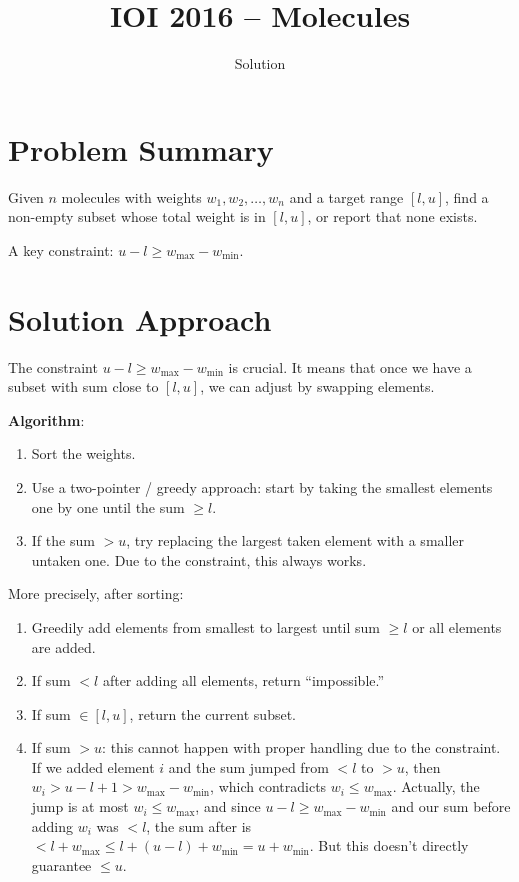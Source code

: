 \documentclass[11pt,a4paper]{article}
\title{IOI 2016 -- Molecules}
\author{Solution}
\date{}
\begin{document}
\maketitle

\section{Problem Summary}

Given $n$ molecules with weights $w_1, w_2, \ldots, w_n$ and a target range $[l, u]$, find a non-empty subset whose total weight is in $[l, u]$, or report that none exists.

A key constraint: $u - l \ge w_{\max} - w_{\min}$.

\section{Solution Approach}

The constraint $u - l \ge w_{\max} - w_{\min}$ is crucial. It means that once we have a subset with sum close to $[l, u]$, we can adjust by swapping elements.

\textbf{Algorithm}:
\begin{enumerate}
  \item Sort the weights.
  \item Use a two-pointer / greedy approach: start by taking the smallest elements one by one until the sum $\ge l$.
  \item If the sum $> u$, try replacing the largest taken element with a smaller untaken one. Due to the constraint, this always works.
\end{enumerate}

More precisely, after sorting:
\begin{enumerate}
  \item Greedily add elements from smallest to largest until sum $\ge l$ or all elements are added.
  \item If sum $< l$ after adding all elements, return ``impossible.''
  \item If sum $\in [l, u]$, return the current subset.
  \item If sum $> u$: this cannot happen with proper handling due to the constraint. If we added element $i$ and the sum jumped from $< l$ to $> u$, then $w_i > u - l + 1 > w_{\max} - w_{\min}$, which contradicts $w_i \le w_{\max}$. Actually, the jump is at most $w_i \le w_{\max}$, and since $u - l \ge w_{\max} - w_{\min}$ and our sum before adding $w_i$ was $< l$, the sum after is $< l + w_{\max} \le l + (u - l) + w_{\min} = u + w_{\min}$. But this doesn't directly guarantee $\le u$.
\end{enumerate}
\end{document}
